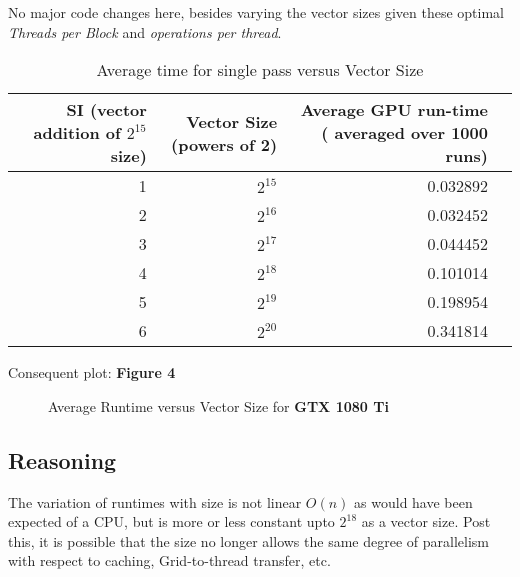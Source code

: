  No major code changes here, besides varying the vector sizes given these optimal \textit{Threads per Block} and \textit{operations per thread}. \\

\begin{table}[ht]
\footnotesize
\centering
\begin{tabular}{r||rrr}
 SI (vector addition of $2^{15}$ size) & Vector Size (powers of 2) & Average GPU run-time ( averaged over 1000 runs)  \\ 
 \hline \hline
1 & $2^{15}$ &  0.032892 \\ 
2& $2^{16}$   & 0.032452 \\
3&  $2^{17}$ & 0.044452 \\
4&  $2^{18}$ & 0.101014 \\
5&  $2^{19}$ & 0.198954 \\
6 &  $2^{20}$ &0.341814 \\
\end{tabular}
\caption{Average time for single pass versus Vector Size}
\end{table}
 
 Consequent plot: \textbf{Figure 4}
 
 \begin{figure}[ht]
\centering
\caption{Average Runtime versus Vector Size for \textbf{GTX 1080 Ti}}
\end{figure}


\subsection{Reasoning}

The variation of runtimes with size is not linear $O(n)$ as would have been expected of a CPU, but is more or less constant upto $2^{18}$ as a vector size. Post this, it is possible that the size no longer allows the same degree of parallelism with respect to caching, Grid-to-thread transfer, etc.
 
